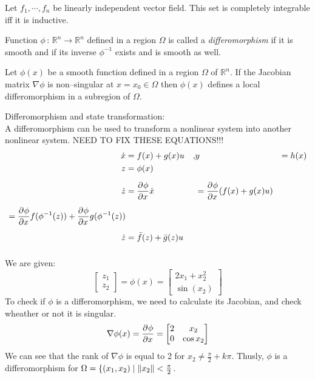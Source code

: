 {
    Let $f_1,\cdots ,f_n$ be linearly independent vector field.
    This set is completely integrable iff it is inductive.
}



{
    Function $\phi \,:\,\mathbb{R}^{n} \longrightarrow \mathbb{R}^{n} $ defined in a region $\Omega$ is called a \textit{differomorphism} if it
    is smooth and if its inverse $\phi^{-1}$ exists and is smooth as well.
}

\mlenma{}
{
    Let $\phi(x)$ be a smooth function defined in a region $\Omega$ of $\mathbb{R}^{n}$. If the Jacobian matrix $\nabla \phi $ is non--singular at
    $x = x_0 \in \Omega$ then $\phi(x)$ defines a local differomorphism in a subregion of $\Omega$.
}


\nt
{
    Differomorphism and state transformation:\\
    A differomorphism can be used to transform a nonlinear
    system into another nonlinear system. 
    NEED TO FIX THESE EQUATIONS!!!
    \ex{}
    {
        \begin{equation}
            \begin{aligned}
                \dot{x} &= f(x) + g(x)u &,& y &=h(x)\\
                z&= \phi(x)&\mbox{}\\[1.25ex]
                \dot{z}&= \pdv{\phi}{x}\dot{x}&&= \pdv{\phi }{x}(f(x)+g(x)u)\\[1.25ex]
                =\pdv{\phi }{x}f(\phi^{-1}(z)) + \pdv{\phi }{x}g(\phi^{-1}(z))&&\mbox{}\\[1.25ex]
                \dot{z}&=\bar{f}(z) + \bar{g}(z)u&\mbox{}\\[1.25ex]
                
               
                
            \end{aligned}
        \end{equation}
    }
}


\ex{}
{
    We are given:
    \begin{equation}
        \begin{bmatrix}
            z_1  \\
            z_2
        \end{bmatrix} = \phi(x) = \begin{bmatrix}
            2x_1 +x_2^{2}  \\
            \sin(x_2)
        \end{bmatrix}
    \end{equation}
    To check if $\phi $ is a differomorphism, we need to calculate its Jacobian, and check wheather or not it is singular.
    \begin{equation}
        \nabla \phi (x) = \frac{\partial^{}\phi}{\partial x^{}} = \begin{bmatrix}
            2 & x_2 \\
            0 & \cos{x_2}
        \end{bmatrix}
    \end{equation}
    We can see that the rank of $\nabla \phi $ is equal to 2 for $x_2\neq \frac{\pi }{2} + k\pi $. Thusly, $\phi $ is a differomorphism for $\Omega = \{(x_1,x_2) \mid \lVert x_2\rVert < \frac{\pi }{2}$.
}

